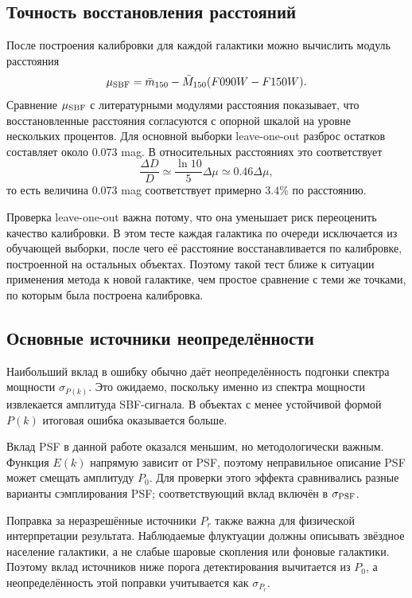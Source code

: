 \documentclass[12pt,a4paper]{article}
\begin{document}
\subsection{Точность восстановления расстояний}

После построения калибровки для каждой галактики можно вычислить модуль расстояния
\begin{equation}
    \mu_{\rm SBF} = \bar{m}_{150} - \bar{M}_{150}(F090W-F150W).
\end{equation}
Сравнение $\mu_{\rm SBF}$ с литературными модулями расстояния показывает, что восстановленные расстояния согласуются с опорной шкалой на уровне нескольких процентов. Для основной выборки leave-one-out разброс остатков составляет около $0.073$ mag. В относительных расстояниях это соответствует
\begin{equation}
    \frac{\Delta D}{D} \simeq \frac{\ln 10}{5}\Delta\mu \simeq 0.46\Delta\mu,
\end{equation}
то есть величина $0.073$ mag соответствует примерно $3.4\%$ по расстоянию.

Проверка leave-one-out важна потому, что она уменьшает риск переоценить качество калибровки. В этом тесте каждая галактика по очереди исключается из обучающей выборки, после чего её расстояние восстанавливается по калибровке, построенной на остальных объектах. Поэтому такой тест ближе к ситуации применения метода к новой галактике, чем простое сравнение с теми же точками, по которым была построена калибровка.

\subsection{Основные источники неопределённости}

Наибольший вклад в ошибку обычно даёт неопределённость подгонки спектра мощности $\sigma_{P(k)}$. Это ожидаемо, поскольку именно из спектра мощности извлекается амплитуда SBF-сигнала. В объектах с менее устойчивой формой $P(k)$ итоговая ошибка оказывается больше.

Вклад PSF в данной работе оказался меньшим, но методологически важным. Функция $E(k)$ напрямую зависит от PSF, поэтому неправильное описание PSF может смещать амплитуду $P_0$. Для проверки этого эффекта сравнивались разные варианты сэмплирования PSF; соответствующий вклад включён в $\sigma_{\rm PSF}$.

Поправка за неразрешённые источники $P_r$ также важна для физической интерпретации результата. Наблюдаемые флуктуации должны описывать звёздное население галактики, а не слабые шаровые скопления или фоновые галактики. Поэтому вклад источников ниже порога детектирования вычитается из $P_0$, а неопределённость этой поправки учитывается как $\sigma_{P_r}$.
\end{document}
